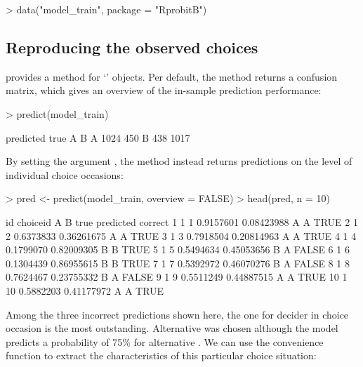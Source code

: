 \documentclass[article]{jss}
\newcommand{\class}[1]{`\code{#1}'}
\newcommand{\fct}[1]{\code{#1()}}
\begin{document}
\begin{Schunk}
\begin{Sinput}
> data("model_train", package = "RprobitB")
\end{Sinput}
\end{Schunk}


\subsection{Reproducing the observed choices} \label{subsec:reproducing_observed_choices}

 provides a \fct{predict} method for \class{RprobitB\_fit} objects. Per default, the method returns a confusion matrix, which gives an overview of the in-sample prediction performance:

\begin{Schunk}
\begin{Sinput}
> predict(model_train)
\end{Sinput}
\begin{Soutput}
    predicted
true    A    B
   A 1024  450
   B  438 1017
\end{Soutput}
\end{Schunk}

By setting the argument , the method instead returns predictions on the level of individual choice occasions:

\begin{Schunk}
\begin{Sinput}
> pred <- predict(model_train, overview = FALSE)
> head(pred, n = 10)
\end{Sinput}
\begin{Soutput}
   id choiceid         A          B true predicted correct
1   1        1 0.9157601 0.08423988    A         A    TRUE
2   1        2 0.6373833 0.36261675    A         A    TRUE
3   1        3 0.7918504 0.20814963    A         A    TRUE
4   1        4 0.1799070 0.82009305    B         B    TRUE
5   1        5 0.5494634 0.45053656    B         A   FALSE
6   1        6 0.1304439 0.86955615    B         B    TRUE
7   1        7 0.5392972 0.46070276    B         A   FALSE
8   1        8 0.7624467 0.23755332    B         A   FALSE
9   1        9 0.5511249 0.44887515    A         A    TRUE
10  1       10 0.5882203 0.41177972    A         A    TRUE
\end{Soutput}
\end{Schunk}

Among the three incorrect predictions shown here, the one for decider  in choice occasion  is the most outstanding. Alternative  was chosen although the model predicts a probability of 75\% for alternative . We can use the convenience function \fct{get\_cov} to extract the characteristics of this particular choice situation:
\end{document}
